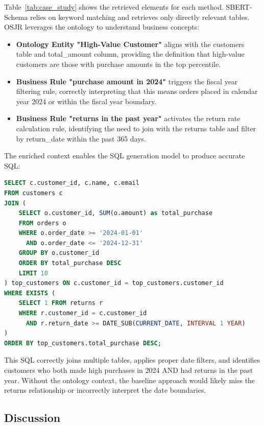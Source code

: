 \documentclass[sigconf, nonatbib]{acmart}
\begin{document}
Table~\ref{tab:case_study} shows the retrieved elements for each method. SBERT-Schema relies on keyword matching and retrieves only directly relevant tables. OSJR leverages the ontology to understand business concepts:

\begin{itemize}
    \item \textbf{Ontology Entity "High-Value Customer"} aligns with the customers table and total\_amount column, providing the definition that high-value customers are those with purchase amounts in the top percentile.
    
    \item \textbf{Business Rule "purchase amount in 2024"} triggers the fiscal year filtering rule, correctly interpreting that this means orders placed in calendar year 2024 or within the fiscal year boundary.
    
    \item \textbf{Business Rule "returns in the past year"} activates the return rate calculation rule, identifying the need to join with the returns table and filter by return\_date within the past 365 days.
\end{itemize}

The enriched context enables the SQL generation model to produce accurate SQL:

\begin{lstlisting}[language=SQL, label={lst:generated_sql}, caption={Generated SQL for the case study query}]
SELECT c.customer_id, c.name, c.email
FROM customers c
JOIN (
    SELECT o.customer_id, SUM(o.amount) as total_purchase
    FROM orders o
    WHERE o.order_date >= '2024-01-01' 
      AND o.order_date <= '2024-12-31'
    GROUP BY o.customer_id
    ORDER BY total_purchase DESC
    LIMIT 10
) top_customers ON c.customer_id = top_customers.customer_id
WHERE EXISTS (
    SELECT 1 FROM returns r
    WHERE r.customer_id = c.customer_id
      AND r.return_date >= DATE_SUB(CURRENT_DATE, INTERVAL 1 YEAR)
)
ORDER BY top_customers.total_purchase DESC;
\end{lstlisting}

This SQL correctly joins multiple tables, applies proper date filters, and identifies customers who both made high purchases in 2024 AND had returns in the past year. Without the ontology context, the baseline approach would likely miss the returns relationship or incorrectly interpret the date boundaries.

\subsection{Discussion}
\end{document}
